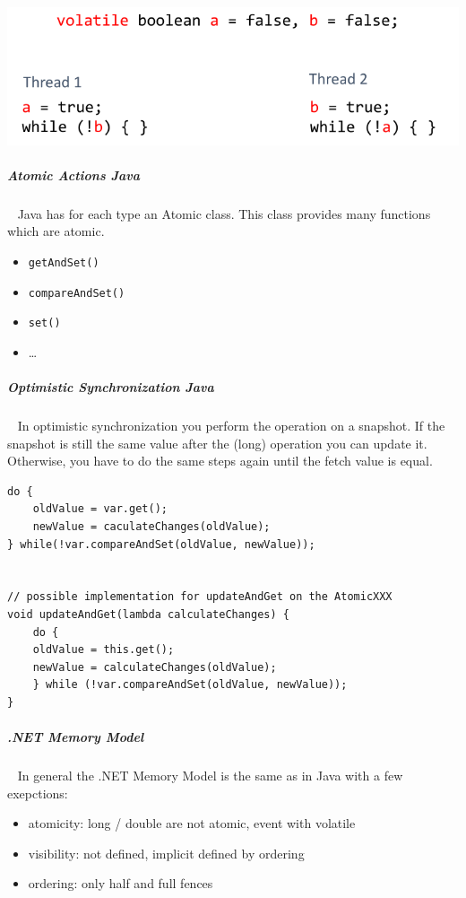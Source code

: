 \documentclass[11pt,twoside,landscape]{article}
\begin{document}
\begin{multicols}{3}
{{{
\begin{center}
\includegraphics[width=.9\linewidth]{img/total_order.png}
\end{center}
\label{fig:total-order-rendez-vous}
}
\subparagraph{Atomic Actions Java} \
\label{sec:org9c7d558}
Java has for each type an Atomic class.
This class provides many functions which are atomic.
\begin{itemize}
\item \texttt{getAndSet()}
\item \texttt{compareAndSet()}
\item \texttt{set()}
\item \ldots{}
\end{itemize}

\subparagraph{Optimistic Synchronization Java} \
\label{sec:orge5c3046}
In optimistic synchronization you perform the operation on a snapshot.
If the snapshot is still the same value after the (long) operation you can update it.
Otherwise, you have to do the same steps again until the fetch value is equal.

\lstset{language=java,label= ,caption= ,captionpos=b,numbers=none}
\begin{lstlisting}
do {
    oldValue = var.get();
    newValue = caculateChanges(oldValue);
} while(!var.compareAndSet(oldValue, newValue));


// possible implementation for updateAndGet on the AtomicXXX
void updateAndGet(lambda calculateChanges) {
    do {
	oldValue = this.get();
	newValue = calculateChanges(oldValue);
    } while (!var.compareAndSet(oldValue, newValue));
}
\end{lstlisting}

\subparagraph{.NET Memory Model} \
\label{sec:org713f9c0}
In general the .NET Memory Model is the same as in Java with a few exepctions:
\begin{itemize}
\item atomicity: long / double are not atomic, event with volatile
\item visibility: not defined, implicit defined by ordering
\item ordering: only half and full fences
\end{itemize}


}}
\end{multicols}
\end{document}
